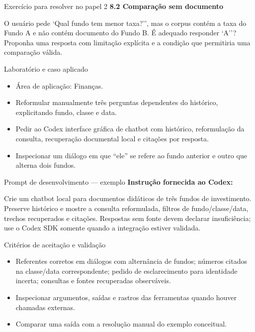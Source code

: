 \documentclass[10pt,aspectratio=169]{beamer}
\begin{document}
\begin{frame}[t]{Exercício para resolver no papel 2}
\small
\small\textbf{8.2 Comparação sem documento}\par\vspace{4mm}O usuário pede `Qual fundo tem menor taxa?'', mas o corpus contém a taxa do Fundo A e não contém documento do Fundo B. É adequado responder `A''? Proponha uma resposta com limitação explícita e a condição que permitiria uma comparação válida.
\end{frame}

\begin{frame}[t]{Laboratório e caso aplicado}
\small
\begin{itemize}
\item Área de aplicação: Finanças.
\item Reformular manualmente três perguntas dependentes do histórico, explicitando fundo, classe e data.
\item Pedir ao Codex interface gráfica de chatbot com histórico, reformulação da consulta, recuperação documental local e citações por resposta.
\item Inspecionar um diálogo em que ``ele'' se refere ao fundo anterior e outro que alterna dois fundos.
\end{itemize}
\end{frame}

\begin{frame}[t]{Prompt de desenvolvimento — exemplo}
\small
\small\textbf{Instrução fornecida ao Codex:}\par\vspace{5mm}Crie um chatbot local para documentos didáticos de três fundos de investimento. Preserve histórico e mostre a consulta reformulada, filtros de fundo/classe/data, trechos recuperados e citações. Respostas sem fonte devem declarar insuficiência; use o Codex SDK somente quando a integração estiver validada.
\end{frame}

\begin{frame}[t]{Critérios de aceitação e validação}
\small
\begin{itemize}
\item Referentes corretos em diálogos com alternância de fundos; números citados na classe/data correspondente; pedido de esclarecimento para identidade incerta; consultas e fontes recuperadas observáveis.
\item Inspecionar argumentos, saídas e rastros das ferramentas quando houver chamadas externas.
\item Comparar uma saída com a resolução manual do exemplo conceitual.
\end{itemize}
\end{frame}
\end{document}
